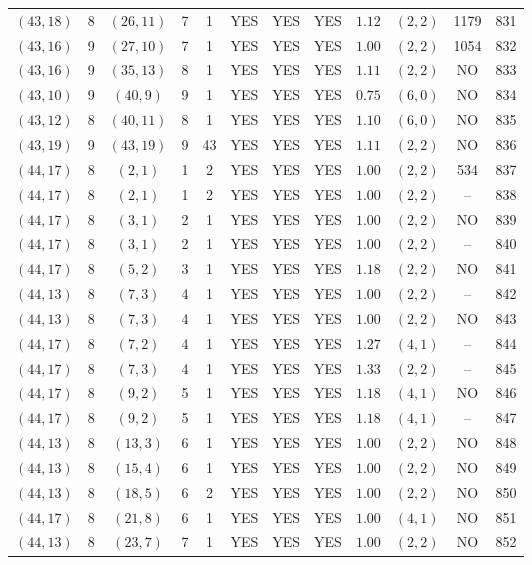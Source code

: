 \begin{longtable}{|c|c|c|c|c|c|c|c|c|c|c|c|}
$(43,18)$ & 8 & $(26,11)$ & 7 & 1 & YES & YES & YES & $1.12$ & $(2,2)$ & 1179 & 831\\
$(43,16)$ & 9 & $(27,10)$ & 7 & 1 & YES & YES & YES & $1.00$ & $(2,2)$ & 1054 & 832\\
$(43,16)$ & 9 & $(35,13)$ & 8 & 1 & YES & YES & YES & $1.11$ & $(2,2)$ & NO & 833\\
$(43,10)$ & 9 & $(40,9)$ & 9 & 1 & YES & YES & YES & $0.75$ & $(6,0)$ & NO & 834\\
$(43,12)$ & 8 & $(40,11)$ & 8 & 1 & YES & YES & YES & $1.10$ & $(6,0)$ & NO & 835\\
$(43,19)$ & 9 & $(43,19)$ & 9 & 43 & YES & YES & YES & $1.11$ & $(2,2)$ & NO & 836\\
$(44,17)$ & 8 & $(2,1)$ & 1 & 2 & YES & YES & YES & $1.00$ & $(2,2)$ & 534 & 837\\
$(44,17)$ & 8 & $(2,1)$ & 1 & 2 & YES & YES & YES & $1.00$ & $(2,2)$ & -- & 838\\
$(44,17)$ & 8 & $(3,1)$ & 2 & 1 & YES & YES & YES & $1.00$ & $(2,2)$ & NO & 839\\
$(44,17)$ & 8 & $(3,1)$ & 2 & 1 & YES & YES & YES & $1.00$ & $(2,2)$ & -- & 840\\
$(44,17)$ & 8 & $(5,2)$ & 3 & 1 & YES & YES & YES & $1.18$ & $(2,2)$ & NO & 841\\
$(44,13)$ & 8 & $(7,3)$ & 4 & 1 & YES & YES & YES & $1.00$ & $(2,2)$ & -- & 842\\
$(44,13)$ & 8 & $(7,3)$ & 4 & 1 & YES & YES & YES & $1.00$ & $(2,2)$ & NO & 843\\
$(44,17)$ & 8 & $(7,2)$ & 4 & 1 & YES & YES & YES & $1.27$ & $(4,1)$ & -- & 844\\
$(44,17)$ & 8 & $(7,3)$ & 4 & 1 & YES & YES & YES & $1.33$ & $(2,2)$ & -- & 845\\
$(44,17)$ & 8 & $(9,2)$ & 5 & 1 & YES & YES & YES & $1.18$ & $(4,1)$ & NO & 846\\
$(44,17)$ & 8 & $(9,2)$ & 5 & 1 & YES & YES & YES & $1.18$ & $(4,1)$ & -- & 847\\
$(44,13)$ & 8 & $(13,3)$ & 6 & 1 & YES & YES & YES & $1.00$ & $(2,2)$ & NO & 848\\
$(44,13)$ & 8 & $(15,4)$ & 6 & 1 & YES & YES & YES & $1.00$ & $(2,2)$ & NO & 849\\
$(44,13)$ & 8 & $(18,5)$ & 6 & 2 & YES & YES & YES & $1.00$ & $(2,2)$ & NO & 850\\
$(44,17)$ & 8 & $(21,8)$ & 6 & 1 & YES & YES & YES & $1.00$ & $(4,1)$ & NO & 851\\
$(44,13)$ & 8 & $(23,7)$ & 7 & 1 & YES & YES & YES & $1.00$ & $(2,2)$ & NO & 852\\

\end{longtable}
